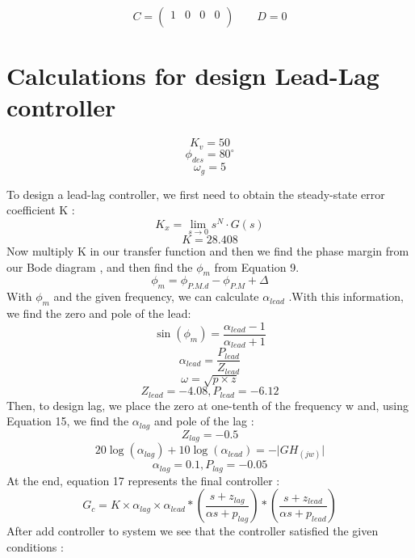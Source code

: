 \documentclass[conference]{IEEEtran}
\begin{document}
\[
C=
\begin{pmatrix}
	1 & 0&0 &0  \\
\end{pmatrix}
\qquad D=0
\]


\section{Calculations for design Lead-Lag controller }
\begin{equation}
	K_{v} = 50     
\end{equation}
\begin{equation}
	\phi_{des} = 80^\circ
\end{equation}
\begin{equation}
	\omega_{g} = 5
\end{equation}


To design a lead-lag controller, we first need to obtain the steady-state error coefficient K :
\begin{equation}
	K_x = \lim_{s \to 0} s^N \cdot G(s)
\end{equation}
\begin{equation}
	K = 28.408 
\end{equation}
Now multiply K in our transfer function and then we find the phase margin from our Bode diagram , and then find the $\phi_{m}$ from Equation 9.
\begin{equation}
	\phi_{m} = \phi_{P.M.d} - \phi_{P.M} + \Delta 
\end{equation}
With $\phi_{m}$ and the given frequency, we can calculate $\alpha_{lead}$ .With this information, we find the zero and pole of the lead:
\begin{equation}
	\sin(\phi_{m}) = \frac{\alpha_{lead} - 1}{\alpha_{lead} + 1} 
\end{equation}
\begin{equation}
	\alpha_{lead} = \frac{P_{lead}}{Z_{lead}} 
\end{equation}
\begin{equation}
	\omega = \sqrt{p \times z} 
\end{equation}
\begin{equation}
	Z_{lead} = -4.08  ,  P_{lead} = -6.12  
\end{equation}
Then, to design lag, we place the zero at one-tenth of the frequency w and, using Equation 15, we find the $\alpha_{lag}$ and pole of the lag :
\begin{equation}
	Z_{lag} = -0.5 
\end{equation}
\begin{equation}
	20\log(\alpha_{lag}) + 10\log(\alpha_{lead}) = -\lvert GH_{(jw)} \rvert
\end{equation}
\begin{equation}
	\alpha_{lag} = 0.1 , P_{lag} = -0.05
\end{equation}
At the end, equation 17 represents the final controller :
\begin{equation}
	G_{c} = K \times \alpha_{lag} \times \alpha_{lead} * \left( \frac{s + z_{lag}}{\alpha s + p_{lag}} \right) * \left( \frac{s + z_{lead}}{\alpha s + p_{lead}} \right)
\end{equation}
After add controller to system we see that the controller satisfied the given conditions :
\end{document}
